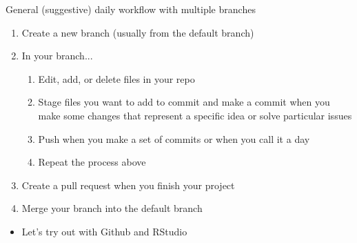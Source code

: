 \documentclass[handout,pdftex,10pt,aspectratio=169]{beamer}
\begin{document}
\begin{frame}{General (suggestive) daily workflow with multiple branches}
  \begin{enumerate}[<+->]
    \item Create a new branch (usually from the default branch)
    \item In your branch...
    \begin{enumerate}
      \item Edit, add, or delete files in your repo
      \item Stage files you want to add to commit and
      make a commit when you make some changes that represent a specific idea or solve particular issues
      \item Push when you make a set of commits or when you call it a day
      \item Repeat the process above
    \end{enumerate}
    \item Create a pull request when you finish your project
    \item Merge your branch into the default branch
  \end{enumerate}
  \begin{itemize}
    \item<10-> Let's try out with Github and RStudio
  \end{itemize}
\end{frame}
\end{document}
